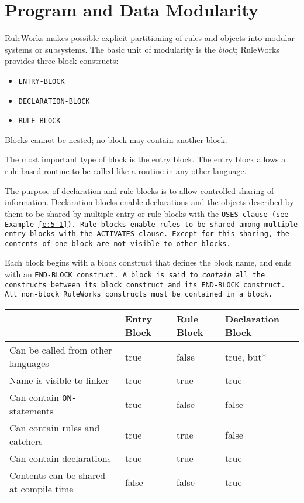 \chapter{Program and Data Modularity}
\label{c:program}

RuleWorks makes possible explicit partitioning of rules and objects
into modular systems or subsystems. The basic unit of modularity is
the \emph{block}; RuleWorks provides three block constructs:

\begin{itemize}
\item\tt{ENTRY-BLOCK}
\item\tt{DECLARATION-BLOCK}
\item\tt{RULE-BLOCK}
\end{itemize}

\begin{note}
  Blocks cannot be nested; no block may contain another block.
\end{note}

The most important type of block is the entry block. The entry block
allows a rule-based routine to be called like a routine in any other
language.

The purpose of declaration and rule blocks is to allow controlled
sharing of information.  Declaration blocks enable declarations and
the objects described by them to be shared by multiple entry or rule
blocks with the \tt{USES} clause (see Example~\ref{e:5-1}). Rule
blocks enable rules to be shared among multiple entry blocks with the
\tt{ACTIVATES} clause. Except for this sharing, the contents of one
block are not visible to other blocks.

Each block begins with a block construct that defines the block name,
and ends with an \tt{END-BLOCK} construct. A block is said to
\emph{contain} all the constructs between its block construct and its
\tt{END-BLOCK} construct. All non-block RuleWorks constructs must be
contained in a block.

\begin{tabularx}{\columnwidth}{Xlll}
  \toprule
  & Entry Block & Rule Block & Declaration Block \\
  \midrule
  Can be called from other languages & true & false & true, but* \\
  Name is visible to linker & true & true & true \\
  Can contain \verb|ON-| statements & true & false & false \\
  Can contain rules and catchers & true & true & false \\
  Can contain declarations & true & true & true \\
  Contents can be shared at compile time & false & false & true \\
  \bottomrule
\end{tabularx}

